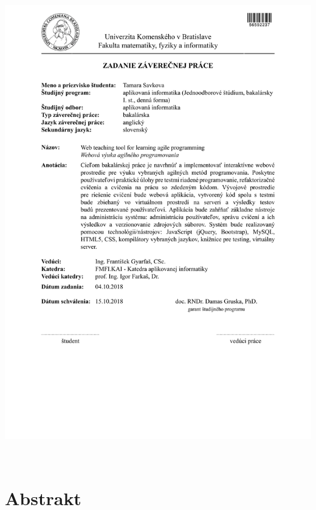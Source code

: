 \documentclass[12pt, oneside]{book}  %
\begin{document}
\newpage 
\thispagestyle{empty}
\hspace{-2cm}\includegraphics[width=1.1\textwidth]{images/zadanie}


\frontmatter

\setcounter{page}{3}
\newpage 
~



\newpage 
\section*{Abstrakt}
\end{document}

